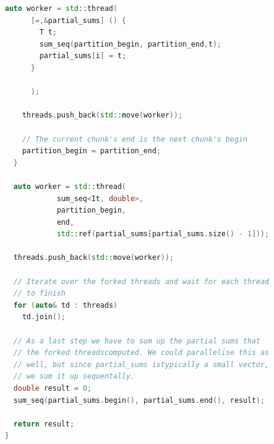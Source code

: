 \begin{lstlisting}[language=C++]
    auto worker = std::thread(
      [=,&partial_sums] () {
        T t;
        sum_seq(partition_begin, partition_end,t);
        partial_sums[i] = t;
      }
      
      );

    threads.push_back(std::move(worker));

    // The current chunk's end is the next chunk's begin
    partition_begin = partition_end;
  }
  
  auto worker = std::thread(
            sum_seq<It, double>, 
            partition_begin, 
            end, 
            std::ref(partial_sums[partial_sums.size() - 1]));

  threads.push_back(std::move(worker));

  // Iterate over the forked threads and wait for each thread 
  // to finish
  for (auto& td : threads)
    td.join();

  // As a last step we have to sum up the partial sums that 
  // the forked threadscomputed. We could parallelise this as 
  // well, but since partial_sums istypically a small vector, 
  // we sum it up sequentally.
  double result = 0;
  sum_seq(partial_sums.begin(), partial_sums.end(), result);
  
  return result;
}
\end{lstlisting}

